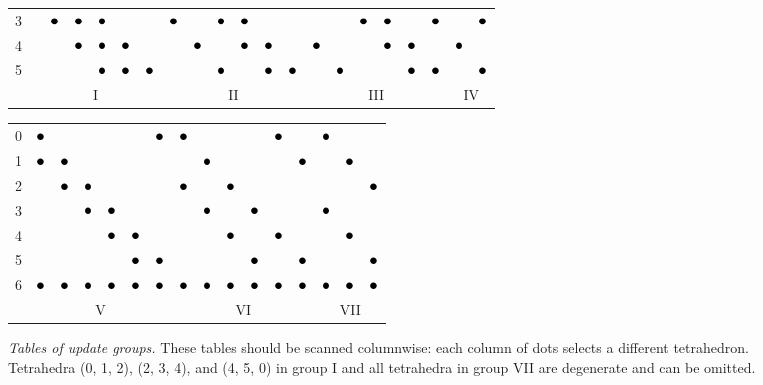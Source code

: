 \documentclass{article}
\begin{document}
\begin{figure}
{\begin{tabular}{c|cccccc|cccccc|cccccc|cc}
      3 & & $\groupmarker$ & $\groupmarker$ & $\groupmarker$ & & & $\groupmarker$ & & $\groupmarker$ & $\groupmarker$ & & & & & $\groupmarker$ & $\groupmarker$ & & $\groupmarker$ & & $\groupmarker$ \\
      4 & & & $\groupmarker$ & $\groupmarker$ & $\groupmarker$ & & & $\groupmarker$ & & $\groupmarker$ & $\groupmarker$ & & $\groupmarker$ & & & $\groupmarker$ & $\groupmarker$ & & $\groupmarker$ & \\
      5 & & & & $\groupmarker$ & $\groupmarker$ & $\groupmarker$ & & & $\groupmarker$ & & $\groupmarker$ & $\groupmarker$ & & $\groupmarker$ & & & $\groupmarker$ & $\groupmarker$ & & $\groupmarker$ \\
      \multicolumn{1}{c}{} & \multicolumn{6}{c}{I} & \multicolumn{6}{c}{II} & \multicolumn{6}{c}{III} & \multicolumn{2}{c}{IV}
    \end{tabular}%
    \begin{tabular}{c|cccccc|cccccc|ccc}
      0 & $\groupmarker$ & & & & & $\groupmarker$ & $\groupmarker$ & & & & $\groupmarker$ & & $\groupmarker$ & & \\
      1 & $\groupmarker$ & $\groupmarker$ & & & & & & $\groupmarker$ & & & & $\groupmarker$ & & $\groupmarker$ & \\
      2 & & $\groupmarker$ & $\groupmarker$ & & & & $\groupmarker$ & & $\groupmarker$ & & & & & & $\groupmarker$ \\
      3 & & & $\groupmarker$ & $\groupmarker$ & & & & $\groupmarker$ & & $\groupmarker$ & & & $\groupmarker$ & & \\
      4 & & & & $\groupmarker$ & $\groupmarker$ & & & & $\groupmarker$ & & $\groupmarker$ & & & $\groupmarker$ & \\
      5 & & & & & $\groupmarker$ & $\groupmarker$ & & & & $\groupmarker$ & & $\groupmarker$ & & & $\groupmarker$ \\
      6 & $\groupmarker$ & $\groupmarker$ & $\groupmarker$ & $\groupmarker$ & $\groupmarker$ & $\groupmarker$ & $\groupmarker$ & $\groupmarker$ & $\groupmarker$ & $\groupmarker$ & $\groupmarker$ & $\groupmarker$ & $\groupmarker$ & $\groupmarker$ & $\groupmarker$ \\
      \multicolumn{1}{c}{} & \multicolumn{6}{c}{V} & \multicolumn{6}{c}{VI} & \multicolumn{3}{c}{VII}
    \end{tabular}%
  }
  \caption{\emph{Tables of update groups.} These tables should be
    scanned columnwise: each column of dots selects a different
    tetrahedron. Tetrahedra (0, 1, 2), (2, 3, 4), and (4, 5, 0) in
    group I and all tetrahedra in group VII are degenerate and can be
    omitted.}\label{fig:tetrahedra-groups}
\end{figure}
\end{document}
